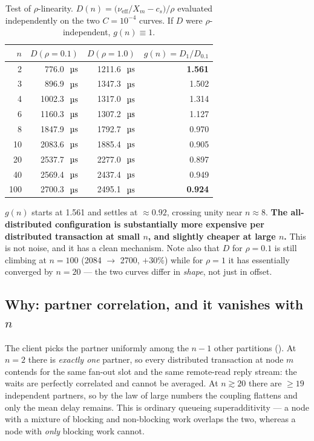 \documentclass[11pt,a4paper]{article}
\newcommand{\pernode}{X_m}
\newcommand{\msecs}{\ensuremath{\,\text{\textmu}\text{s}}}
\newcommand{\srcfile}[1]{\texttt{\footnotesize\detokenize{#1}}}
\newcommand{\nueff}{\ensuremath{\nu_{\mathrm{eff}}}}
\newcommand{\gRatio}{g(n)}
\begin{document}
\begin{table}[H]
\centering
\caption{Test of $\rho$-linearity. $D(n) = \bigl(\nueff/\pernode - c_s\bigr)/\rho$
evaluated independently on the two $C=10^{-4}$ curves. If $D$ were
$\rho$-independent, $\gRatio\equiv 1$.}
\label{tab:rhonl}
\begin{tabular}{@{}rrrr@{}}
\toprule
\textbf{$n$} & \textbf{$D(\rho{=}0.1)$} & \textbf{$D(\rho{=}1.0)$} &
\textbf{$\gRatio = D_1/D_{0.1}$} \\
\midrule
  2 & \SI{776.0}{\msecs}  & \SI{1211.6}{\msecs} & \textbf{1.561} \\
  3 & \SI{896.9}{\msecs}  & \SI{1347.3}{\msecs} & 1.502 \\
  4 & \SI{1002.3}{\msecs} & \SI{1317.0}{\msecs} & 1.314 \\
  6 & \SI{1160.3}{\msecs} & \SI{1307.2}{\msecs} & 1.127 \\
  8 & \SI{1847.9}{\msecs} & \SI{1792.7}{\msecs} & 0.970 \\
 10 & \SI{2083.6}{\msecs} & \SI{1885.4}{\msecs} & 0.905 \\
 20 & \SI{2537.7}{\msecs} & \SI{2277.0}{\msecs} & 0.897 \\
 40 & \SI{2569.4}{\msecs} & \SI{2437.4}{\msecs} & 0.949 \\
\midrule
100 & \SI{2700.3}{\msecs} & \SI{2495.1}{\msecs} & \textbf{0.924} \\
\bottomrule
\end{tabular}
\end{table}

$\gRatio$ starts at \num{1.561} and settles at $\approx\num{0.92}$, crossing
unity near $n\approx8$. \textbf{The all-distributed configuration is
substantially more expensive per distributed transaction at small $n$, and
slightly cheaper at large $n$.} This is not noise, and it has a clean
mechanism. Note also that $D$ for $\rho=0.1$ is still climbing at
$n=100$ (\num{2084} $\to$ \num{2700}, $+30\%$) while for $\rho=1$ it has
essentially converged by $n=20$ --- the two curves differ in \emph{shape}, not
just in offset.

\subsection{Why: partner correlation, and it vanishes with $n$}
\label{sec:rhonl}

The client picks the partner uniformly among the $n-1$ other partitions
(\srcfile{client.h:57}). At $n=2$ there is \emph{exactly one} partner, so every
distributed transaction at node $m$ contends for the same fan-out slot and the
same remote-read reply stream: the waits are perfectly correlated and cannot
be averaged. At $n\gtrsim20$ there are $\ge19$ independent partners, so by the
law of large numbers the coupling flattens and only the mean delay remains.
This is ordinary queueing superadditivity --- \textemdash{} a node with a
mixture of blocking and non-blocking work overlaps the two, whereas a node with
\emph{only} blocking work cannot.
\end{document}
